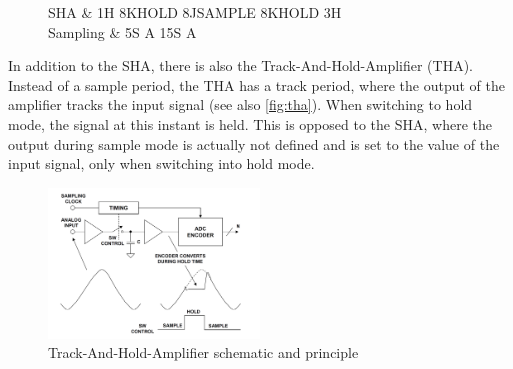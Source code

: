 \begin{figure} [H]
	\centering
	\tikzexternaldisable
	\begin{tikztimingtable}
		[%
		timing/dslope=0.1,
		timing/name/.style={font=\sffamily\normalsize},
		timing/d/text/.style={font=\sffamily\normalsize},
		grayz/.style={timing/z/.append style={gray}},
		timing/n/.style={rectangle},
		timing/metachar={{K}[2]{#1l !{++(0,+.5\yunit)} N[rectangle,scale=.6]{\shortstack{#2}} !{++(0,-.5\yunit)} #1l}},
		timing/metachar={{J}[2]{#1h !{++(0,-.5\yunit)} N[rectangle,scale=.6]{\shortstack{#2}} !{++(0,+.5\yunit)} #1h}},
		]
		SHA & 1H 8K{HOLD} 8J{SAMPLE} 8K{HOLD} 3H\\
		Sampling & 5S A 15S A                    \\
	\end{tikztimingtable}
	\tikzexternalenable
\end{figure}

In addition to the SHA, there is also the Track-And-Hold-Amplifier (THA). Instead of a sample period, the THA has a track period, where the output of the amplifier tracks the input signal (see also \autoref{fig:tha}). When switching to hold mode, the signal at this instant is held. This is opposed to the SHA, where the output during sample mode is actually not defined and is set to the value of the input signal, only when switching into hold mode. 

\begin{figure}[H]
	\centering
	\includegraphics[width = 0.5\textwidth]{chap/02-theory/img/tha}
	\caption{Track-And-Hold-Amplifier schematic and principle \cite{walt}}
	\label{fig:tha}
\end{figure}

